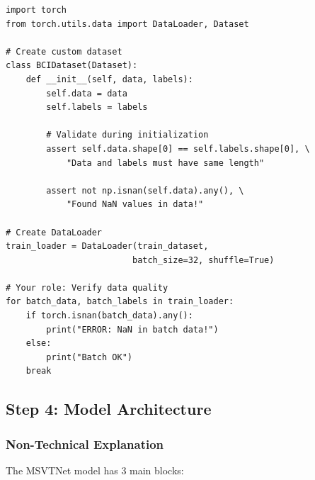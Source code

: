 \documentclass[12pt,a4paper]{article}
\begin{document}
\begin{lstlisting}[caption={Data Validation Before Training}]
import torch
from torch.utils.data import DataLoader, Dataset

# Create custom dataset
class BCIDataset(Dataset):
    def __init__(self, data, labels):
        self.data = data
        self.labels = labels
        
        # Validate during initialization
        assert self.data.shape[0] == self.labels.shape[0], \
            "Data and labels must have same length"
        
        assert not np.isnan(self.data).any(), \
            "Found NaN values in data!"

# Create DataLoader
train_loader = DataLoader(train_dataset, 
                         batch_size=32, shuffle=True)

# Your role: Verify data quality
for batch_data, batch_labels in train_loader:
    if torch.isnan(batch_data).any():
        print("ERROR: NaN in batch data!")
    else:
        print("Batch OK")
    break
\end{lstlisting}

\subsection{Step 4: Model Architecture}

\subsubsection{Non-Technical Explanation}

The MSVTNet model has 3 main blocks:
\end{document}

